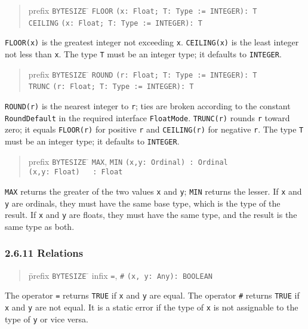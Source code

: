 \documentclass[10pt]{article}
\begin{document}
\begin{quote}
  \begin{tabbing}
    prefix \= \verb|BYTESIZE| \= \kill
           \> \verb|FLOOR|   \> \verb|(x: Float; T: Type := INTEGER): T| \\
           \> \verb|CEILING| \> \verb|(x: Float; T: Type := INTEGER): T|
  \end{tabbing}
\end{quote}
\verb|FLOOR(x)| is the greatest integer not exceeding \verb|x|.
\verb|CEILING(x)| is the least integer not less than \verb|x|.
The type \verb|T| must be an integer type; it defaults to \verb|INTEGER|.

\begin{quote}
  \begin{tabbing}
    prefix \= \verb|BYTESIZE| \= \kill
           \> \verb|ROUND|   \> \verb|(r: Float; T: Type := INTEGER): T| \\
           \> \verb|TRUNC|   \> \verb|(r: Float; T: Type := INTEGER): T|
  \end{tabbing}
\end{quote}
\verb|ROUND(r)| is the nearest integer to \verb|r|; ties are broken according
to the constant \verb|RoundDefault| in the required interface
\verb|FloatMode|.  \verb|TRUNC(r)| rounds \verb|r| toward zero; it equals
\verb|FLOOR(r)| for positive \verb|r| and \verb|CEILING(r)| for negative
\verb|r|.
The type \verb|T| must be an integer type; it defaults to \verb|INTEGER|.

\begin{quote}
  \begin{tabbing}
    prefix \= \verb|BYTESIZE| \= \kill
           \> \verb|MAX|, \verb|MIN| \> \verb|(x,y: Ordinal) : Ordinal| \\
           \>                        \> \verb|(x,y: Float)   : Float|
  \end{tabbing}
\end{quote}
\verb|MAX| returns the greater of the two values \verb|x| and \verb|y|;
\verb|MIN| returns the lesser.  If \verb|x| and \verb|y| are ordinals, they
must have the same base type, which is the type of the result.  If \verb|x|
and \verb|y| are floats, they must have the same type, and the result is the
same type as both.

\subsubsection*{2.6.11 Relations}

\begin{quote}
  \begin{tabbing}
    \=prefix \= \verb|BYTESIZE| \= \kill
    \>infix  \> \verb|=|, \verb|#|     \> \verb|(x, y: Any): BOOLEAN|
  \end{tabbing}
\end{quote}
The operator \verb|=| returns \verb|TRUE| if \verb|x| and \verb|y| are equal.
The operator \verb|#| returns \verb|TRUE| if \verb|x| and \verb|y| are not
equal.  It is a static error if the type of \verb|x| is not assignable to the
type of \verb|y| or vice versa.
\end{document}
